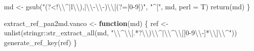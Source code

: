\documentclass[
]{article}
\newenvironment{Shaded}{\begin{snugshade}}{\end{snugshade}}
\newcommand{\AttributeTok}[1]{\textcolor[rgb]{0.77,0.63,0.00}{#1}}
\newcommand{\ControlFlowTok}[1]{\textcolor[rgb]{0.13,0.29,0.53}{\textbf{#1}}}
\newcommand{\FunctionTok}[1]{\textcolor[rgb]{0.00,0.00,0.00}{#1}}
\newcommand{\NormalTok}[1]{#1}
\newcommand{\OtherTok}[1]{\textcolor[rgb]{0.56,0.35,0.01}{#1}}
\newcommand{\SpecialCharTok}[1]{\textcolor[rgb]{0.00,0.00,0.00}{#1}}
\newcommand{\StringTok}[1]{\textcolor[rgb]{0.31,0.60,0.02}{#1}}
\begin{document}
\begin{Shaded}
\begin{Highlighting}[]
\NormalTok{  md }\OtherTok{\textless{}{-}} \FunctionTok{gsub}\NormalTok{(}\StringTok{"(?\textless{}!}\SpecialCharTok{\textbackslash{}\textbackslash{}}\StringTok{\^{}|l}\SpecialCharTok{\textbackslash{}\textbackslash{}}\StringTok{),|}\SpecialCharTok{\textbackslash{}\textbackslash{}}\StringTok{{-}}\SpecialCharTok{\textbackslash{}\textbackslash{}}\StringTok{{-})}\SpecialCharTok{\textbackslash{}\textbackslash{}}\StringTok{[(?=[0{-}9])"}\NormalTok{, }\StringTok{"\^{}["}\NormalTok{, md, }\AttributeTok{perl =}\NormalTok{ T)}
  \FunctionTok{return}\NormalTok{(md)}
\NormalTok{\}}

\NormalTok{extract\_ref\_pan2md.vanco }\OtherTok{\textless{}{-}} \ControlFlowTok{function}\NormalTok{(md) \{}
\NormalTok{  ref }\OtherTok{\textless{}{-}} \FunctionTok{unlist}\NormalTok{(stringr}\SpecialCharTok{::}\FunctionTok{str\_extract\_all}\NormalTok{(md, }\StringTok{"}\SpecialCharTok{\textbackslash{}\textbackslash{}}\StringTok{\^{}}\SpecialCharTok{\textbackslash{}\textbackslash{}}\StringTok{[.*?}\SpecialCharTok{\textbackslash{}\textbackslash{}}\StringTok{)}\SpecialCharTok{\textbackslash{}\textbackslash{}}\StringTok{\^{}|}\SpecialCharTok{\textbackslash{}\textbackslash{}}\StringTok{\^{}}\SpecialCharTok{\textbackslash{}\textbackslash{}}\StringTok{[[0{-}9}\SpecialCharTok{\textbackslash{}\textbackslash{}}\StringTok{{-}]*}\SpecialCharTok{\textbackslash{}\textbackslash{}}\StringTok{]}\SpecialCharTok{\textbackslash{}\textbackslash{}}\StringTok{\^{}"}\NormalTok{))}
  \FunctionTok{generate\_ref\_key}\NormalTok{(ref)}
\NormalTok{\}}
\end{Highlighting}
\end{Shaded}
\end{document}
